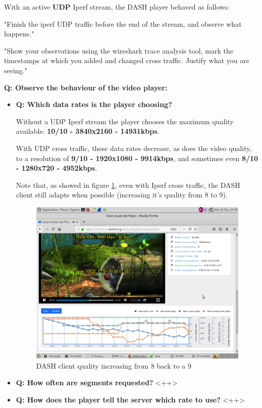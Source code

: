 \documentclass{article}
\newcommand{\Question}[1]{\textbf{Q: #1}}
\begin{document}
With an active \textbf{UDP} Iperf stream, the DASH player behaved as follows:


"Finish the iperf UDP traffic before the end of the stream, and observe what happens." 

"Show your observations using the wireshark trace analysis tool, mark the 
timestamps at which you added and changed cross traffic. 
Justify what you are seeing."

\Question{Observe the behaviour of the video player:}
\begin{itemize}

    \item \Question{Which data rates is the player choosing?}
        
        Without a UDP Iperf stream the player chooses the maximum quality 
        available: \textbf{10/10 - 3840x2160 - 14931kbps}. 
        
        With UDP cross traffic, these data rates decrease, as does the video 
        quality, to a resolution of \textbf{9/10 - 1920x1080 - 9914kbps}, 
        and sometimes even \textbf{8/10 - 1280x720 - 4952kbps}. 

        Note that, as showed in figure \ref{fig:UDPDASH_8to9}, even with 
        Iperf cross traffic, the DASH client still adapts when possible 
        (increasing it's quality from 8 to 9).
    \begin{figure}[h!]
        \centering
        \includegraphics[width=0.8\linewidth,keepaspectratio]{PoorQuality}
        \caption{DASH client quality increasing from 8 back to a 9}
        \label{fig:UDPDASH_8to9}
    \end{figure}
    \FloatBarrier
        
    \item \Question{How often are segments requested?}
        <++>
    \item \Question{How does the player tell the server which rate to use?}
        <++>

\end{itemize}
\end{document}
